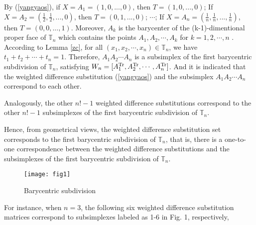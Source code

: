 \documentclass [10pt,a4paper]{article}
\begin{document}
 By (\ref{yangyaos}), if
$X=A_1=(1,0,...,0)$, then $T=(1,0,...,0)$; If
$X=A_2=(\frac{1}{2},\frac{1}{2},...,0)$, then $T=(0,1,...,0)$;
$\cdots$; If $X=A_n=(\frac{1}{n},\frac{1}{n},...,\frac{1}{n})$, then
$T=(0,0,...,1)$. Moreover, $A_k $ is the barycenter of the
(k-1)-dimentional proper face of $\mathbb{T}_n$ which contains the
points $A_1, A_2, \cdots, A_k$ for $k=1,2,\cdots,n$ .  According to
Lemma \ref{zc}, for all $(x_1,x_2,\cdots,x_n)\in \mathbb{T}_n$, we
have $t_1+t_2+\cdots +t_n=1$. Therefore, $A_1A_2\cdots A_n$ is a
subsimplex of the first barycentric subdivision of $ \mathbb{T}_n$,
satisfying
$W_n=[A_1^{\textmd{Tr}},A_2^{\textrm{Tr}},\cdots,A_n^{\textmd{Tr}}]$.
And it is indicated that the weighted dif\mbox{}ference substitution
(\ref{yangyaos}) and  the subsimplex $A_1A_2\cdots A_n$ correspond
to each other.

 Analogously,  the other $n!-1$ weighted dif\mbox{}ference substitutions correspond
 to  the other
 $n!-1$ subsimplexes of the first barycentric subdivision of $\mathbb{T}_n$.

  Hence, from geometrical
 views, the weighted dif\mbox{}ference substitution set corresponds to
  the f\mbox{}irst barycentric subdivision of $\mathbb{T}_n$, that is,  there is a one-to-one correspondence between the weighted dif\mbox{}ference substitutions and the  subsimplexes of the first
barycentric subdivision of $ \mathbb{T}_n$.
 \begin{figure}[H]
\begin{center}
\texttt{[image: fig1]}
 \caption{Barycentric subdivision}\label{Fig1}
\end{center}
\end{figure}

  For instance, when $n=3$, the following six weighted dif\mbox{}ference substitution
  matrices correspond to subsimplexes labeled as 1-6 in Fig. 1,
  respectively,
\end{document}
